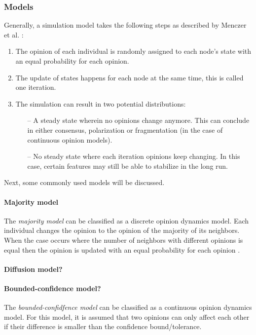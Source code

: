 \subsubsection{Models\nopunct}\hfill \break
Generally, a simulation model takes the following steps as described by Menczer et al. \cite{menczer_fortunato_davis_2020}:
\begin{enumerate}
    \item The opinion of each individual is randomly assigned to each node's state with an equal probability for each opinion.
    \item The update of states happens for each node at the same time, this is called one iteration.
    \item The simulation can result in two potential distributions:
    \begin{itemize}
        \item[--] A steady state wherein no opinions change anymore. This can conclude in either consensus, polarization or fragmentation (in the case of continuous opinion models).
        \item[--] No steady state where each iteration opinions keep changing. In this case, certain features may still be able to stabilize in the long run.
    \end{itemize}
\end{enumerate}
Next, some commonly used models will be discussed.
\paragraph{Majority model}
The \textit{majority model} can be classified as a discrete opinion dynamics model. Each individual changes the opinion to the opinion of the majority of its neighbors. When the case occurs where the number of neighbors with different opinions is equal then the opinion is updated with an equal probability for each opinion \cite{menczer_fortunato_davis_2020}.
\paragraph{Diffusion model?} \cite{sayama_2020}
\paragraph{Bounded-confidence model?}
The \textit{bounded-confidfence model} can be classified as a continuous opinion dynamics model. For this model, it is assumed that two opinions can only affect each other if their difference is smaller than the confidence bound/tolerance.


